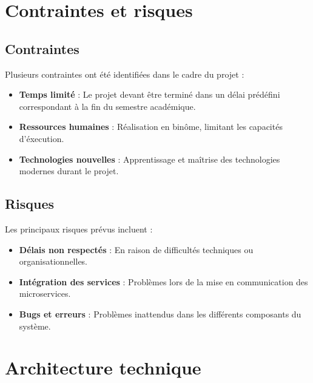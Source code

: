 \documentclass[12pt,a4paper]{report}
\begin{document}
\newpage
\section{Contraintes et risques}
\subsection*{Contraintes}
Plusieurs contraintes ont \'et\'e identifi\'ees dans le cadre du projet :
\begin{itemize}
    \item \textbf{Temps limit\'e} : Le projet devant \^etre termin\'e dans un d\'elai pr\'ed\'efini correspondant \`a la fin du semestre acad\'emique.
    \item \textbf{Ressources humaines} : R\'ealisation en bin\^ome, limitant les capacit\'es d'\'execution.
    \item \textbf{Technologies nouvelles} : Apprentissage et ma\^itrise des technologies modernes durant le projet.
\end{itemize}

\subsection*{Risques}
Les principaux risques pr\'evus incluent :
\begin{itemize}
    \item \textbf{D\'elais non respect\'es} : En raison de difficult\'es techniques ou organisationnelles.
    \item \textbf{Int\'egration des services} : Probl\`emes lors de la mise en communication des microservices.
    \item \textbf{Bugs et erreurs} : Probl\`emes inattendus dans les diff\'erents composants du syst\`eme.
\end{itemize}


\section{Architecture technique}
\end{document}

